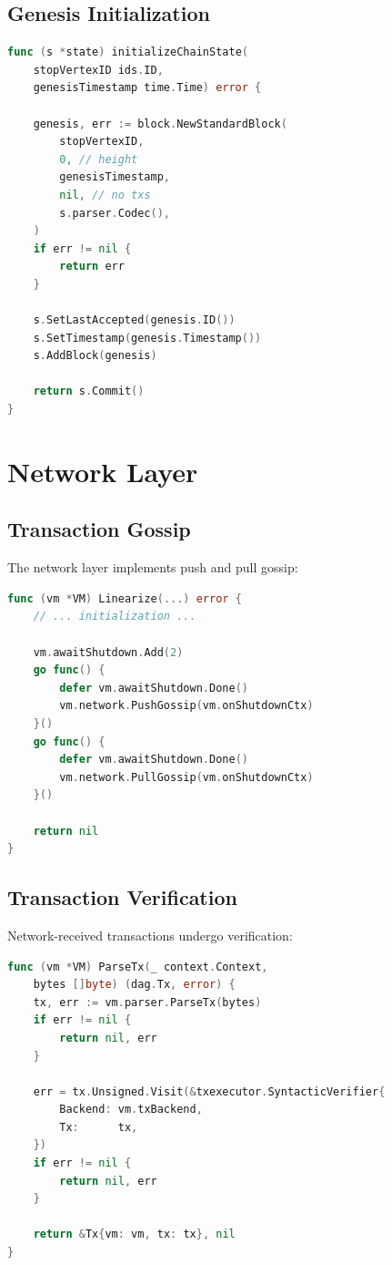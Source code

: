 \documentclass[11pt,a4paper]{article}
\begin{document}
\subsection{Genesis Initialization}

\begin{lstlisting}[language=Go,caption={Chain State Initialization}]
func (s *state) initializeChainState(
    stopVertexID ids.ID,
    genesisTimestamp time.Time) error {

    genesis, err := block.NewStandardBlock(
        stopVertexID,
        0, // height
        genesisTimestamp,
        nil, // no txs
        s.parser.Codec(),
    )
    if err != nil {
        return err
    }

    s.SetLastAccepted(genesis.ID())
    s.SetTimestamp(genesis.Timestamp())
    s.AddBlock(genesis)

    return s.Commit()
}
\end{lstlisting}

\section{Network Layer}

\subsection{Transaction Gossip}

The network layer implements push and pull gossip:

\begin{lstlisting}[language=Go,caption={Gossip Protocol}]
func (vm *VM) Linearize(...) error {
    // ... initialization ...

    vm.awaitShutdown.Add(2)
    go func() {
        defer vm.awaitShutdown.Done()
        vm.network.PushGossip(vm.onShutdownCtx)
    }()
    go func() {
        defer vm.awaitShutdown.Done()
        vm.network.PullGossip(vm.onShutdownCtx)
    }()

    return nil
}
\end{lstlisting}

\subsection{Transaction Verification}

Network-received transactions undergo verification:

\begin{lstlisting}[language=Go,caption={Transaction Verification}]
func (vm *VM) ParseTx(_ context.Context,
    bytes []byte) (dag.Tx, error) {
    tx, err := vm.parser.ParseTx(bytes)
    if err != nil {
        return nil, err
    }

    err = tx.Unsigned.Visit(&txexecutor.SyntacticVerifier{
        Backend: vm.txBackend,
        Tx:      tx,
    })
    if err != nil {
        return nil, err
    }

    return &Tx{vm: vm, tx: tx}, nil
}
\end{lstlisting}
\end{document}

